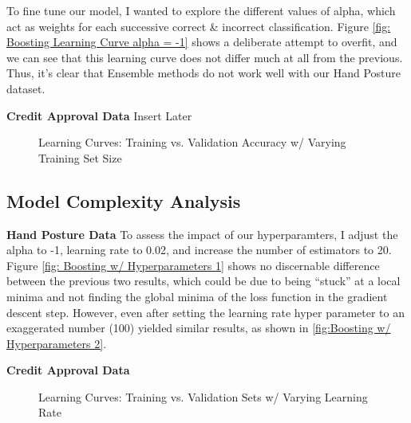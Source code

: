 \documentclass[letterpaper,12pt]{article}
\begin{document}
To fine tune our model, I wanted to explore the different values of alpha, which act as weights for each successive correct \& incorrect classification.  Figure \ref{fig: Boosting Learning Curve alpha = -1} shows a deliberate attempt to overfit, and we can see that this learning curve does not differ much at all from the previous.  Thus, it's clear that Ensemble methods do not work well with our Hand Posture dataset.  

\textbf{Credit Approval Data}
Insert Later

\begin{figure} %
  \centering
  \hspace{8pt}%
  \caption{Learning Curves:  Training vs. Validation Accuracy w/ Varying Training Set Size}\label{fig:Boosting Learning Curves}
\end{figure}

\subsection{Model Complexity Analysis}
\textbf{Hand Posture Data}  To assess the impact of our hyperparamters, I adjust the alpha to -1, learning rate to 0.02, and increase the number of estimators to 20.  Figure \ref{fig: Boosting w/ Hyperparameters 1} shows no discernable difference between the previous two results, which could be due to being ``stuck'' at a local minima and not finding the global minima of the loss function in the gradient descent step.  However, even after setting the learning rate hyper parameter to an exaggerated number (100) yielded similar results, as shown in \ref{fig:Boosting w/ Hyperparameters 2}.

\textbf{Credit Approval Data}

\begin{figure} %
  \centering
  \hspace{8pt}%
  \caption{Learning Curves:  Training vs. Validation Sets w/ Varying Learning Rate}\label{fig:Boosting Model Complexity Curves}
\end{figure}
\end{document}
